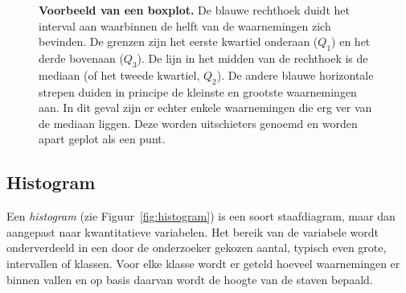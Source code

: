 \begin{figure}
  \centering
  \caption[Voorbeeld van een boxplot]{\textbf{Voorbeeld van een boxplot.} De blauwe rechthoek duidt het interval aan waarbinnen de helft van de waarnemingen zich bevinden. De grenzen zijn het eerste kwartiel onderaan ($Q_1$) en het derde bovenaan ($Q_3$). De lijn in het midden van de rechthoek is de mediaan (of het tweede kwartiel, $Q_2$). De andere blauwe horizontale strepen duiden in principe de kleinste en grootste waarnemingen aan. In dit geval zijn er echter enkele waarnemingen die erg ver van de mediaan liggen. Deze worden uitschieters genoemd en worden apart geplot als een punt.}
  \label{fig:boxplot}
\end{figure}

\subsection{Histogram}

Een \emph{histogram} (zie Figuur~\ref{fig:histogram}) is een soort staafdiagram, maar dan aangepast naar kwantitatieve variabelen. Het bereik van de variabele wordt onderverdeeld in een door de onderzoeker gekozen aantal, typisch even grote, intervallen of klassen. Voor elke klasse wordt er geteld hoeveel waarnemingen er binnen vallen en op basis daarvan wordt de hoogte van de staven bepaald.

